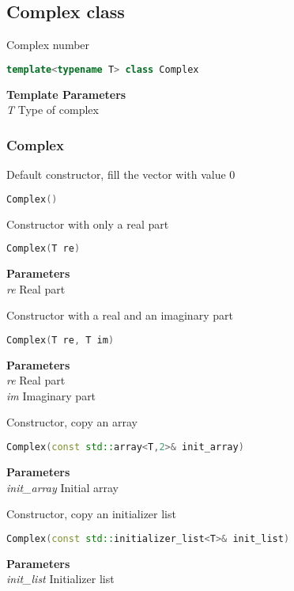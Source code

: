 \subsection{Complex  class}
Complex number
\begin{lstlisting}[language=C++]
template<typename T> class Complex 
\end{lstlisting}
\textbf{Template Parameters} \\ 
\textit{T} Type of complex \\ 

\subsubsection{Complex}
\begin{mdframed}
Default constructor, fill the vector with value 0
\begin{lstlisting}[language=C++]
Complex()
\end{lstlisting}
\end{mdframed}

\begin{mdframed}
Constructor with only a real part
\begin{lstlisting}[language=C++]
Complex(T re)
\end{lstlisting}
\textbf{Parameters} \\ 
\textit{re} Real part \\ 
\end{mdframed}

\begin{mdframed}
Constructor with a real and an imaginary part
\begin{lstlisting}[language=C++]
Complex(T re, T im)
\end{lstlisting}
\textbf{Parameters} \\ 
\textit{re} Real part \\ 
\textit{im} Imaginary part \\ 
\end{mdframed}

\begin{mdframed}
Constructor, copy an array
\begin{lstlisting}[language=C++]
Complex(const std::array<T,2>& init_array)
\end{lstlisting}
\textbf{Parameters} \\ 
\textit{init\_array} Initial array \\ 
\end{mdframed}

\begin{mdframed}
Constructor, copy an initializer list
\begin{lstlisting}[language=C++]
Complex(const std::initializer_list<T>& init_list)
\end{lstlisting}
\textbf{Parameters} \\ 
\textit{init\_list} Initializer list \\ 
\end{mdframed}

